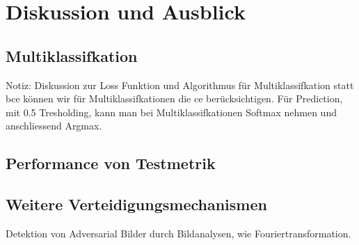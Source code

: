 \section{Diskussion und Ausblick}

\subsection{Multiklassifkation}

Notiz: Diskussion zur Loss Funktion und Algorithmus für Multiklassifkation
statt \acrlong{bce} können wir für Multiklassifkationen die \acrlong{ce} berücksichtigen. 
Für Prediction, mit 0.5 Tresholding, kann man bei Multiklassifkationen Softmax nehmen und anschliessend Argmax. 

\subsection{Performance von Testmetrik}

\subsection{Weitere Verteidigungsmechanismen}
Detektion von Adversarial Bilder durch Bildanalysen, wie Fouriertransformation. 